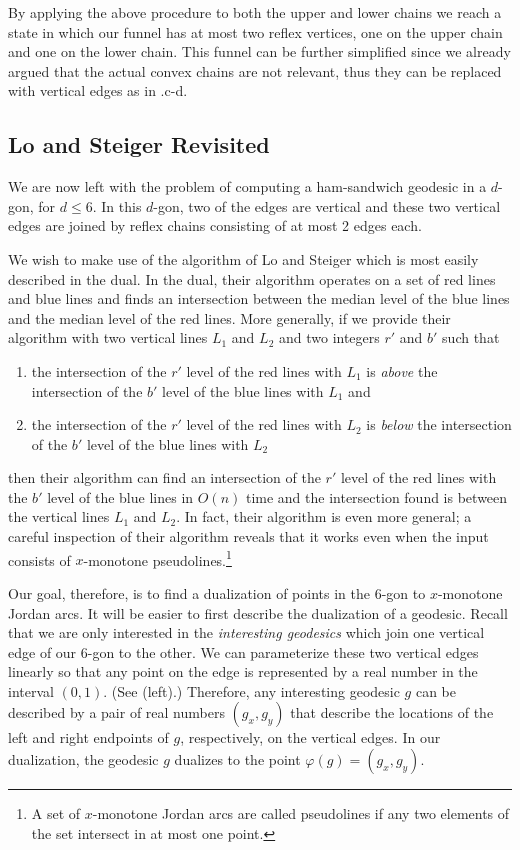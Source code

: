 \documentclass[charterfonts,lotsofwhite]{patmorin}
\newcommand{\dual}[1]{\varphi(#1)}
\begin{document}
By applying the above procedure to both the upper and lower chains
we reach a state in which our funnel has at most two reflex vertices, one
on the upper chain and one on the lower chain.  This funnel can be
further simplified since we already argued that the actual convex
chains are not relevant, thus they can be replaced with vertical
edges as in .c-d.

\subsection{Lo and Steiger Revisited}

We are now left with the problem of computing a ham-sandwich geodesic
in a $d$-gon, for $d\le 6$. In this $d$-gon, two of the edges are
vertical and these two vertical edges are joined by reflex chains
consisting of at most 2 edges each.  

We wish to make use of the algorithm of Lo and Steiger \cite{ls90}
which is most easily described in the dual.  In the dual, their
algorithm operates on a set of red lines and blue lines and finds an
intersection between the median level of the blue lines and the median
level of the red lines.  More generally, if we provide their algorithm
with two vertical lines $L_1$ and $L_2$ and two integers $r'$ and $b'$
such that 
\begin{enumerate}

\item the intersection of the $r'$ level of the red lines with $L_1$
is \emph{above} the intersection of the $b'$ level of the blue lines
with $L_1$ and

\item the intersection of the $r'$ level of the red lines with $L_2$
is \emph{below} the intersection of the $b'$ level of the blue lines
with $L_2$ 

\end{enumerate}
then their algorithm can find an intersection of the $r'$ level of the
red lines with the $b'$ level of the blue lines in $O(n)$ time and the
intersection found is between the vertical lines $L_1$ and $L_2$.  In
fact, their algorithm is even more general;  a careful inspection of
their algorithm reveals that it works even when the input consists of
$x$-monotone pseudolines.\footnote{A set of $x$-monotone Jordan arcs
are called pseudolines if any two elements of the set intersect in at
most one point.}

Our goal, therefore, is to find a dualization of points in the 6-gon
to $x$-monotone Jordan arcs.  It will be easier to first describe the
dualization of a geodesic.  Recall that we are only interested in the
\emph{interesting geodesics} which join one vertical edge of our 6-gon
to the other.  We can parameterize these two vertical edges linearly
so that any point on the edge is represented by a real number in the
interval $(0,1)$.  (See  (left).)  Therefore, any
interesting geodesic $g$ can be described by a pair of real numbers
$(g_x,g_y)$ that describe the locations of the left and right
endpoints of $g$, respectively, on the vertical edges.  In our
dualization, the geodesic $g$ dualizes to the point
$\dual{g}=(g_x,g_y)$.
\end{document}
